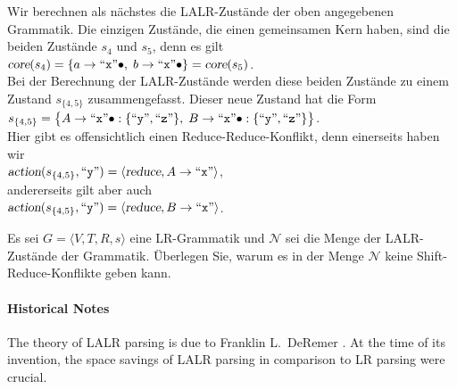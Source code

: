 Wir berechnen als n\"achstes die LALR-Zust\"ande der oben angegebenen Grammatik.  Die einzigen
Zust\"ande, die einen gemeinsamen Kern haben, sind die beiden Zust\"ande $s_4$ und $s_5$, denn
es gilt
\\[0.2cm]
\hspace*{1.3cm}
$\textsl{core}(s_4) = \{ a \rightarrow \mbox{``\texttt{x}''} \bullet,\;
                b \rightarrow \mbox{``\texttt{x}''} \bullet \} = \textsl{core}(s_5)$.
\\[0.2cm]
Bei der Berechnung der LALR-Zust\"ande werden diese beiden Zust\"ande zu einem Zustand
$s_{\{4,5\}}$ zusammengefasst.  Dieser neue Zustand hat die Form
\\[0.2cm]
\hspace*{1.3cm}
$s_{\{4,5\}} = \bigl\{ A \rightarrow \mbox{``\texttt{x}''} \bullet: \{\mbox{``\texttt{y}''}, \mbox{``\texttt{z}''} \},\;
                       B \rightarrow \mbox{``\texttt{x}''} \bullet: \{\mbox{``\texttt{y}''}, \mbox{``\texttt{z}''} \} \bigr\}$.
\\[0.2cm]
Hier gibt es offensichtlich  einen Reduce-Reduce-Konflikt, denn einerseits haben wir
\\[0.2cm]
\hspace*{1.3cm}
$\textsl{action}(s_{\{4,5\}}, \squoted{y}) = \pair(\textsl{reduce}, A \rightarrow \squoted{x})$,
\\[0.2cm]
andererseits gilt aber auch
\\[0.2cm]
\hspace*{1.3cm}
$\textsl{action}(s_{\{4,5\}}, \squoted{y}) = \pair(\textsl{reduce}, B \rightarrow \squoted{x})$.

\exercise
Es sei $G = \langle V, T, R, s \rangle$ eine LR-Grammatik und $\mathcal{N}$ sei die Menge der
LALR-Zust\"ande der Grammatik.  \"Uberlegen Sie, warum es in der Menge $\mathcal{N}$ keine
Shift-Reduce-Konflikte geben kann.  \eox


\paragraph{Historical Notes}
The theory of LALR parsing is due to Franklin L.~DeRemer \cite{deRemer:71}.  At the time of its
invention,  the space savings of LALR parsing in comparison to LR parsing were crucial.  


